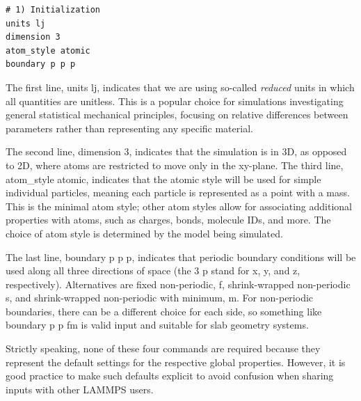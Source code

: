 \documentclass[9pt,tutorial]{livecoms}
\newcommand{\lmpcmd}[1]{\hspace{0pt}\colorbox{listing}{\textcolor{command}{\small{#1}}}\hspace{0pt}} %
\begin{document}
\begin{lstlisting}
# 1) Initialization
units lj
dimension 3
atom_style atomic
boundary p p p
\end{lstlisting}

The first line, \lmpcmd{units lj}, indicates that we are using
so-called \emph{reduced} units in which all quantities are unitless.  This is
a popular choice for simulations investigating general statistical mechanical
principles, focusing on relative differences between parameters rather than
representing any specific material.

The second line, \lmpcmd{dimension 3}, indicates that the simulation is
in 3D, as opposed to 2D, where atoms are restricted to move only in the 
xy-plane.  The third line, \lmpcmd{atom\_style atomic}, indicates that
the \lmpcmd{atomic} style will be used for simple individual particles,
meaning each particle is represented as a point with a mass.  This is the
minimal atom style; other atom styles allow for associating additional properties
with atoms, such as charges, bonds, molecule IDs, and more.  The choice
of atom style is determined by the model being simulated.

The last line, \lmpcmd{boundary p p p}, indicates that periodic boundary
conditions will be used along all three directions of space (the 3
\lmpcmd{p} stand for \lmpcmd{x}, \lmpcmd{y}, and \lmpcmd{z},
respectively).  Alternatives are fixed non-periodic, \lmpcmd{f},
shrink-wrapped non-periodic \lmpcmd{s}, and shrink-wrapped non-periodic
with minimum, \lmpcmd{m}.  For non-periodic boundaries, there can be a
different choice for each side, so something like \lmpcmd{boundary p p
  fm} is valid input and suitable for slab geometry systems.

Strictly speaking, none of these four commands are required because
they represent the default settings for the respective global properties.
However, it is good practice to make such defaults explicit to avoid
confusion when sharing inputs with other LAMMPS users.
\end{document}
